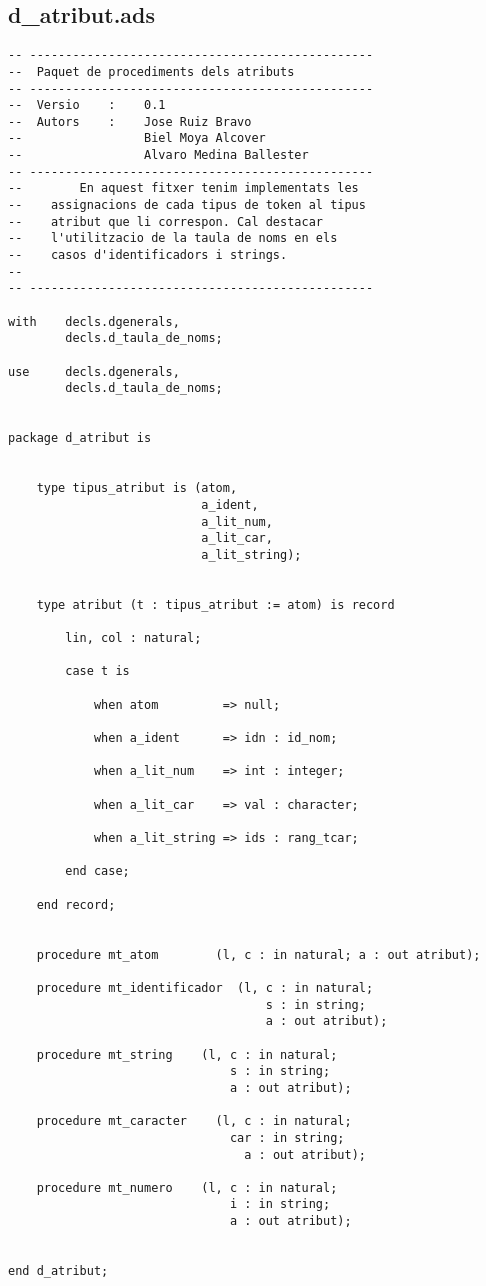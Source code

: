 \documentclass[10pt]{report}
\begin{document}
    \subsection{d\_atribut.ads}
    \begin{lstlisting}[style=Ada]
-- ------------------------------------------------
--  Paquet de procediments dels atributs
-- ------------------------------------------------
--  Versio    :    0.1
--  Autors    :    Jose Ruiz Bravo
--                 Biel Moya Alcover
--                 Alvaro Medina Ballester
-- ------------------------------------------------
--        En aquest fitxer tenim implementats les 
--    assignacions de cada tipus de token al tipus
--    atribut que li correspon. Cal destacar 
--    l'utilitzacio de la taula de noms en els
--    casos d'identificadors i strings.
--
-- ------------------------------------------------

with    decls.dgenerals,
        decls.d_taula_de_noms;
        
use     decls.dgenerals,
        decls.d_taula_de_noms;


package d_atribut is


    type tipus_atribut is (atom,
                           a_ident,
                           a_lit_num,
                           a_lit_car,
                           a_lit_string);
                            
                            
    type atribut (t : tipus_atribut := atom) is record
        
        lin, col : natural;
        
        case t is
        
            when atom         => null;
            
            when a_ident      => idn : id_nom;
            
            when a_lit_num    => int : integer;
            
            when a_lit_car    => val : character;    
            
            when a_lit_string => ids : rang_tcar;
            
        end case;
                
    end record;
    
    
    procedure mt_atom        (l, c : in natural; a : out atribut);
    
    procedure mt_identificador  (l, c : in natural; 
                                    s : in string; 
                                    a : out atribut);
    
    procedure mt_string    (l, c : in natural; 
                               s : in string; 
                               a : out atribut);
    
    procedure mt_caracter    (l, c : in natural; 
                               car : in string; 
                                 a : out atribut);
    
    procedure mt_numero    (l, c : in natural; 
                               i : in string; 
                               a : out atribut);
        
    
end d_atribut;
    \end{lstlisting}
\end{document}
